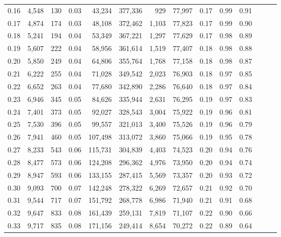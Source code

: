 \begin{tabular}{rrrrrrrrrrrrrr}
0.16 &   4,548 &    130 &  0.03 &   43,234 &  377,336 &     929 &  77,997 &  0.17 &  0.99 &      0.91 \\
0.17 &   4,874 &    174 &  0.03 &   48,108 &  372,462 &   1,103 &  77,823 &  0.17 &  0.99 &      0.90 \\
0.18 &   5,241 &    194 &  0.04 &   53,349 &  367,221 &   1,297 &  77,629 &  0.17 &  0.98 &      0.89 \\
0.19 &   5,607 &    222 &  0.04 &   58,956 &  361,614 &   1,519 &  77,407 &  0.18 &  0.98 &      0.88 \\
0.20 &   5,850 &    249 &  0.04 &   64,806 &  355,764 &   1,768 &  77,158 &  0.18 &  0.98 &      0.87 \\
0.21 &   6,222 &    255 &  0.04 &   71,028 &  349,542 &   2,023 &  76,903 &  0.18 &  0.97 &      0.85 \\
0.22 &   6,652 &    263 &  0.04 &   77,680 &  342,890 &   2,286 &  76,640 &  0.18 &  0.97 &      0.84 \\
0.23 &   6,946 &    345 &  0.05 &   84,626 &  335,944 &   2,631 &  76,295 &  0.19 &  0.97 &      0.83 \\
0.24 &   7,401 &    373 &  0.05 &   92,027 &  328,543 &   3,004 &  75,922 &  0.19 &  0.96 &      0.81 \\
0.25 &   7,530 &    396 &  0.05 &   99,557 &  321,013 &   3,400 &  75,526 &  0.19 &  0.96 &      0.79 \\
0.26 &   7,941 &    460 &  0.05 &  107,498 &  313,072 &   3,860 &  75,066 &  0.19 &  0.95 &      0.78 \\
0.27 &   8,233 &    543 &  0.06 &  115,731 &  304,839 &   4,403 &  74,523 &  0.20 &  0.94 &      0.76 \\
0.28 &   8,477 &    573 &  0.06 &  124,208 &  296,362 &   4,976 &  73,950 &  0.20 &  0.94 &      0.74 \\
0.29 &   8,947 &    593 &  0.06 &  133,155 &  287,415 &   5,569 &  73,357 &  0.20 &  0.93 &      0.72 \\
0.30 &   9,093 &    700 &  0.07 &  142,248 &  278,322 &   6,269 &  72,657 &  0.21 &  0.92 &      0.70 \\
0.31 &   9,544 &    717 &  0.07 &  151,792 &  268,778 &   6,986 &  71,940 &  0.21 &  0.91 &      0.68 \\
0.32 &   9,647 &    833 &  0.08 &  161,439 &  259,131 &   7,819 &  71,107 &  0.22 &  0.90 &      0.66 \\
0.33 &   9,717 &    835 &  0.08 &  171,156 &  249,414 &   8,654 &  70,272 &  0.22 &  0.89 &      0.64 \\

\end{tabular}
